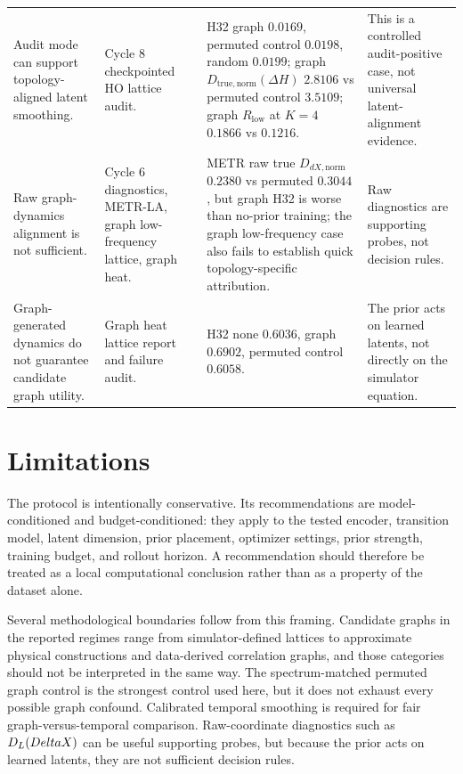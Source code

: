 \documentclass[preprint,12pt]{elsarticle}
\begin{document}
\begin{longtable}{>{\raggedright\arraybackslash}p{}>{\raggedright\arraybackslash}p{}>{\raggedright\arraybackslash}p{}>{\raggedright\arraybackslash}p{}}
Audit mode can support topology-aligned latent smoothing. & Cycle 8 checkpointed HO lattice audit. & H32 graph $0.0169$, permuted control $0.0198$, random $0.0199$; graph $D_{\mathrm{true},\mathrm{norm}}(\Delta H)$ $2.8106$ vs permuted control $3.5109$; graph $R_{\mathrm{low}}$ at $K=4$ $0.1866$ vs $0.1216$. & This is a controlled audit-positive case, not universal latent-alignment evidence. \\
Raw graph-dynamics alignment is not sufficient. & Cycle 6 diagnostics, METR-LA, graph low-frequency lattice, graph heat. & METR raw true $D_{dX,\mathrm{norm}}$ $0.2380$ vs permuted $0.3044$, but graph H32 is worse than no-prior training; the graph low-frequency case also fails to establish quick topology-specific attribution. & Raw diagnostics are supporting probes, not decision rules. \\
Graph-generated dynamics do not guarantee candidate graph utility. & Graph heat lattice report and failure audit. & H32 none $0.6036$, graph $0.6902$, permuted control $0.6058$. & The prior acts on learned latents, not directly on the simulator equation. \\
\end{longtable}
\endgroup

\FloatBarrier

\section{Limitations}

The protocol is intentionally conservative. Its recommendations are model-conditioned and budget-conditioned: they apply to the tested encoder, transition model, latent dimension, prior placement, optimizer settings, prior strength, training budget, and rollout horizon. A recommendation should therefore be treated as a local computational conclusion rather than as a property of the dataset alone.

Several methodological boundaries follow from this framing. Candidate graphs in the reported regimes range from simulator-defined lattices to approximate physical constructions and data-derived correlation graphs, and those categories should not be interpreted in the same way. The spectrum-matched permuted graph control is the strongest control used here, but it does not exhaust every possible graph confound. Calibrated temporal smoothing is required for fair graph-versus-temporal comparison. Raw-coordinate diagnostics such as $D_L(\\Delta X)$ can be useful supporting probes, but because the prior acts on learned latents, they are not sufficient decision rules.
\end{document}
